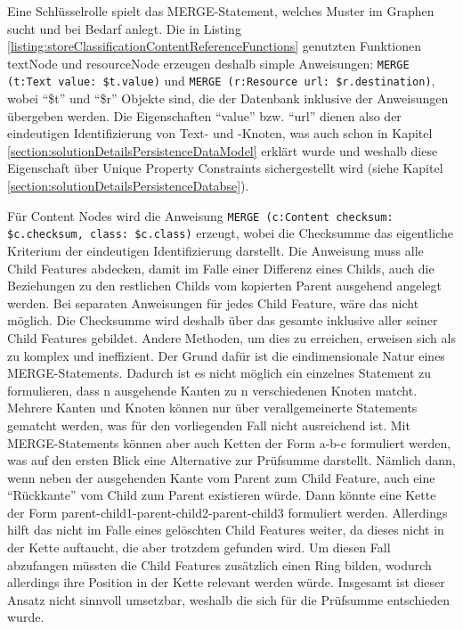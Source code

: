     Eine Schlüsselrolle spielt das MERGE-Statement,
    welches Muster im Graphen sucht und bei Bedarf anlegt.
    Die in Listing \ref{listing:storeClassificationContentReferenceFunctions} genutzten
    Funktionen textNode und resourceNode erzeugen deshalb simple Anweisungen:
    \texttt{MERGE (t:Text {value: \$t.value})} und \texttt{MERGE (r:Resource {url: \$r.destination})},
    wobei "`\$t"' und "`\$r"' Objekte sind, die der Datenbank inklusive der Anweisungen übergeben werden.
    Die Eigenschaften "`value"' bzw. "`url"' dienen also der eindeutigen Identifizierung von
    Text- und {\resource}-Knoten, was auch schon in Kapitel
    \ref{section:solutionDetailsPersistenceDataModel} erklärt wurde
    und weshalb diese Eigenschaft über Unique Property Constraints sichergestellt wird
    (siehe Kapitel \ref{section:solutionDetailsPersistenceDatabse}).

    Für Content Nodes wird die Anweisung
    \texttt{MERGE (c:Content {checksum: \$c.checksum, class: \$c.class})} erzeugt,
    wobei die Checksumme das eigentliche Kriterium der eindeutigen Identifizierung darstellt.
    Die Anweisung muss alle Child Features abdecken, damit im Falle einer Differenz eines Childs,
    auch die Beziehungen zu den restlichen Childs vom kopierten Parent ausgehend angelegt werden.
    Bei separaten Anweisungen für jedes Child Feature, wäre das nicht möglich.
    Die Checksumme wird deshalb über das gesamte {\contentFeature} inklusive aller seiner Child Features gebildet.
    Andere Methoden, um dies zu erreichen, erweisen sich als zu komplex und ineffizient.
    Der Grund dafür ist die eindimensionale Natur eines MERGE-Statements.
    Dadurch ist es nicht möglich ein einzelnes Statement zu formulieren,
    dass n ausgehende Kanten zu n verschiedenen Knoten matcht.
    Mehrere Kanten und Knoten können nur über verallgemeinerte Statements gematcht werden,
    was für den vorliegenden Fall nicht ausreichend ist.
    Mit MERGE-Statements können aber auch Ketten der Form a-b-c formuliert werden,
    was auf den ersten Blick eine Alternative zur Prüfsumme darstellt.
    Nämlich dann, wenn neben der ausgehenden Kante vom Parent zum Child Feature,
    auch eine "`Rückkante"' vom Child zum Parent existieren würde.
    Dann könnte eine Kette der Form parent-child1-parent-child2-parent-child3 formuliert werden.
    Allerdings hilft das nicht im Falle eines gelöschten Child Features weiter,
    da dieses nicht in der Kette auftaucht, die aber trotzdem gefunden wird.
    Um diesen Fall abzufangen müssten die Child Features zusätzlich einen Ring bilden,
    wodurch allerdings ihre Position in der Kette relevant werden würde.
    Insgesamt ist dieser Ansatz nicht sinnvoll umsetzbar,
    weshalb die sich für die Prüfsumme entschieden wurde.

